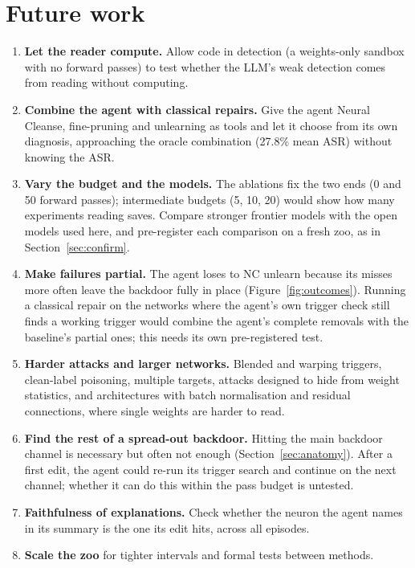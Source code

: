 \documentclass[11pt]{article}
\begin{document}
\section{Future work}
\begin{enumerate}[leftmargin=*]
  \item \textbf{Let the reader compute.} Allow code in detection (a weights-only sandbox with no
    forward passes) to test whether the LLM's weak detection comes from reading without computing.
  \item \textbf{Combine the agent with classical repairs.} Give the agent Neural Cleanse, fine-pruning
    and unlearning as tools and let it choose from its own diagnosis, approaching the oracle
    combination (27.8\% mean ASR) without knowing the ASR.
  \item \textbf{Vary the budget and the models.} The ablations fix the two ends (0 and 50 forward
    passes); intermediate budgets (5, 10, 20) would show how many experiments reading saves. Compare
    stronger frontier models with the open models used here, and pre-register each comparison on a fresh
    zoo, as in Section~\ref{sec:confirm}.
  \item \textbf{Make failures partial.} The agent loses to NC unlearn because its misses more often leave
    the backdoor fully in place (Figure~\ref{fig:outcomes}). Running a classical repair on the networks where the agent's own trigger check
    still finds a working trigger would combine the agent's complete removals with the baseline's partial
    ones; this needs its own pre-registered test.
  \item \textbf{Harder attacks and larger networks.} Blended and warping triggers, clean-label
    poisoning, multiple targets, attacks designed to hide from weight statistics, and architectures
    with batch normalisation and residual connections, where single weights are harder to read.
  \item \textbf{Find the rest of a spread-out backdoor.} Hitting the main backdoor channel is necessary
    but often not enough (Section~\ref{sec:anatomy}). After a first edit, the agent could re-run its trigger
    search and continue on the next channel; whether it can do this within the pass budget is untested.
  \item \textbf{Faithfulness of explanations.} Check whether the neuron the agent names in its summary is
    the one its edit hits, across all episodes.
  \item \textbf{Scale the zoo} for tighter intervals and formal tests between methods.
\end{enumerate}
\end{document}
